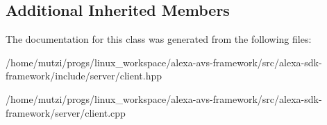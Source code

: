 \subsection*{Additional Inherited Members}


The documentation for this class was generated from the following files\+:\begin{DoxyCompactItemize}
\item 
/home/mutzi/progs/linux\+\_\+workspace/alexa-\/avs-\/framework/src/alexa-\/sdk-\/framework/include/server/client.\+hpp\item 
/home/mutzi/progs/linux\+\_\+workspace/alexa-\/avs-\/framework/src/alexa-\/sdk-\/framework/server/client.\+cpp\end{DoxyCompactItemize}
